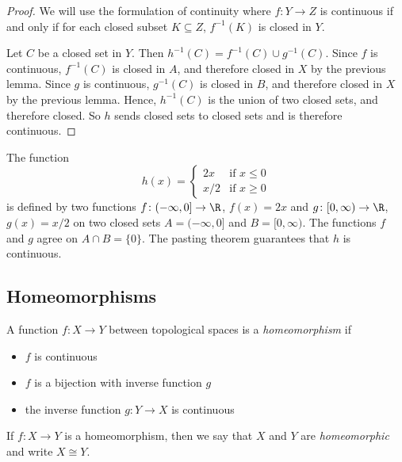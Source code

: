 \documentclass[noname]{notes}
\begin{document}
\begin{proof}
	We will use the formulation of continuity where $f \colon Y \to Z$ is continuous if and only if for each closed subset $K \subseteq Z$, $f^{-1}(K)$ is closed in $Y$. 
	
	Let $C$ be a closed set in $Y$. Then $h^{-1}(C) = f^{-1}(C) \cup g^{-1}(C)$. Since $f$ is continuous, $f^{-1}(C)$ is closed in $A$, and therefore closed in $X$ by the previous lemma. Since $g$ is continuous, $g^{-1}(C)$ is closed in $B$, and therefore closed in $X$ by the previous lemma.
Hence, $h^{-1}(C)$ is the union of two closed sets, and therefore closed. So $h$ sends closed sets to closed sets and is therefore continuous.
\end{proof}

\begin{example}
	The function 
	\[
		h(x) = 
		\begin{cases}
			2x & \text{if \ \ } x \leq 0 \\
			x/2 & \text{if \ \ } x \geq 0
		\end{cases}
	\]
	is defined by two functions $f \colon (-\infty, 0] \to \R$, $f(x) = 2x$ and $g \colon [0,\infty) \to \R$, $g(x) = x/2$ on two closed sets $A = (-\infty,0]$ and $B = [0,\infty)$. The functions $f$ and $g$ agree on $A \cap B = \{0\}$. The pasting theorem guarantees that $h$ is continuous. 
\end{example}

\subsection{Homeomorphisms}

\begin{definition}
	A function $f \colon X \to Y$ between topological spaces is a \emph{homeomorphism} if 
	\begin{itemize}
		\item $f$ is continuous
		\item $f$ is a bijection with inverse function $g$
		\item the inverse function $g \colon Y \to X$ is continuous
	\end{itemize}
\end{definition}

\begin{definition}
	If $f \colon X \to Y$ is a homeomorphism, then we say that $X$ and $Y$ are \emph{homeomorphic} and write $X \cong Y$. 
\end{definition}
\end{document}
